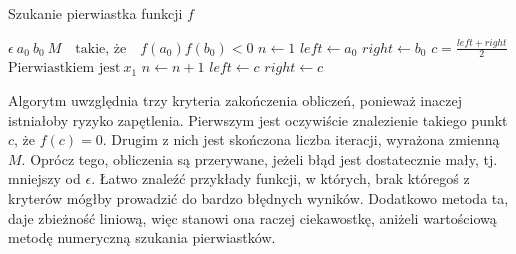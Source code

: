\documentclass[a4paper]{article}
\begin{document}
    \begin{algorithm}
    \caption{Szukanie pierwiastka funkcji $f$}
    \begin{algorithmic}
    \REQUIRE $\epsilon\ a_0\ b_0\ M \quad \text{takie, że} \quad f(a_0)f(b_0) < 0$
        \STATE $n \leftarrow 1$
        \STATE $left \leftarrow a_0$
        \STATE $right \leftarrow b_0$
        \STATE $c = \frac{left + right}{2}$
        \STATE $\text{Pierwiastkiem jest}\ x_1$
        \ELSE
        \STATE $n \leftarrow n + 1$
        \ENDIF
        \STATE $left \leftarrow c$
        \ELSE
        \STATE $right \leftarrow c$
        \ENDIF
        \ENDWHILE
        \end{algorithmic}
    \end{algorithm}

    Algorytm uwzględnia trzy kryteria zakończenia obliczeń, ponieważ inaczej istniałoby
    ryzyko zapętlenia. Pierwszym jest oczywiście znalezienie takiego punkt $c$, że $f(c) = 0$. Drugim z nich jest 
    skończona liczba iteracji, wyrażona zmienną $M$. Oprócz tego, obliczenia są przerywane, 
    jeżeli błąd jest dostatecznie mały, tj. mniejszy od $\epsilon$. Łatwo znaleźć przykłady funkcji, w których,
    brak któregoś z kryterów mógłby prowadzić do bardzo błędnych wyników. Dodatkowo metoda ta, daje zbieżność liniową,
    więc stanowi ona raczej ciekawostkę, aniżeli wartościową metodę numeryczną szukania pierwiastków.
\end{document}
